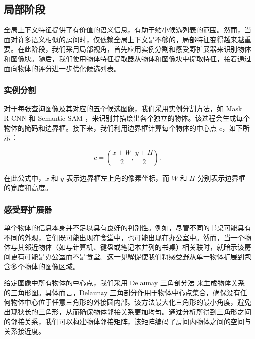 \subsection{局部阶段}

全局上下文特征提供了有价值的语义信息，有助于缩小候选列表的范围。然而，当面对许多语义相似的房间时，仅依赖全局上下文是不够的，局部特征变得越来越重要。在此阶段，我们采用局部视角，首先应用实例分割和感受野扩展器来识别物体和图像块。随后，我们使用物体特征提取器从物体和图像块中提取特征，接着通过面向物体的评分进一步优化候选列表。
\subsubsection{实例分割}

对于每张查询图像及其对应的五个候选图像，我们采用实例分割方法，如 Mask R-CNN \cite{he2018maskrcnn} 和 Semantic-SAM \cite{li2023semanticsamsegmentrecognizegranularity}，来识别并描绘出各个独立的物体。该过程会生成每个物体的掩码和边界框。接下来，我们利用边界框计算每个物体的中心点 \(c\)，如下所示：

\begin{equation}
    c = (\frac{x+W}{2}, \frac{y+H}{2}).
    \label{eq:center point}
\end{equation}

在此公式中，\(x\) 和 \(y\) 表示边界框左上角的像素坐标，而 \(W\) 和 \(H\) 分别表示边界框的宽度和高度。
\subsubsection{感受野扩展器}

单个物体的信息本身并不足以具有良好的判别性。例如，尽管不同的书桌可能具有不同的外观，它们既可能出现在食堂中，也可能出现在办公室中。然而，当一个物体与其邻近物体（如与计算机、键盘或笔记本并列的书桌）相关联时，就暗示该房间更有可能是办公室而不是食堂。这一见解促使我们将感受野从单一物体扩展到包含多个物体的图像区域。

给定图像中所有物体的中心点，我们采用 Delaunay 三角剖分法 \cite{10.5555/1370949} 来生成物体关系的三角形图。具体而言，Delaunay 三角剖分作用于物体中心点集合，确保没有任何物体中心位于任意三角形的外接圆内部。该方法最大化三角形的最小角度，避免出现狭长的三角形，从而确保物体邻接关系更加均匀。通过分析所得到三角形之间的邻接关系，我们可以构建物体邻接矩阵，该矩阵编码了房间内物体之间的空间与关系接近度。

